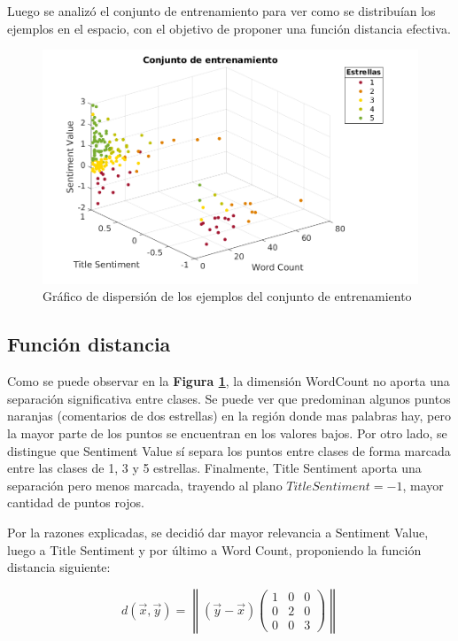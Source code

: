 \documentclass[a4paper]{article}
\newcommand{\reffig}[1]{\textbf{Figura \ref{#1}}}
\begin{document}
Luego se analizó el conjunto de entrenamiento para ver como se distribuían los ejemplos en el espacio, con el objetivo de proponer una función distancia efectiva.

\begin{figure}[h]
  \centering
    \includegraphics[scale=0.5]{img/knn-training-set-scatter.png}
  \caption{Gráfico de dispersión de los ejemplos del conjunto de entrenamiento}
  \label{fig:ej3-scatter-training}
\end{figure}


\subsection{Función distancia}
Como se puede observar en la \reffig{fig:ej3-scatter-training}, la dimensión WordCount no aporta una separación significativa entre clases. Se puede ver que predominan algunos puntos naranjas (comentarios de dos estrellas) en la región donde mas palabras hay, pero la mayor parte de los puntos se encuentran en los valores bajos. Por otro lado, se distingue que Sentiment Value sí separa los puntos entre clases de forma marcada entre las clases de 1, 3 y 5 estrellas. Finalmente, Title Sentiment aporta una separación pero menos marcada, trayendo al plano $TitleSentiment = -1$, mayor cantidad de puntos rojos.

Por la razones explicadas, se decidió dar mayor relevancia a Sentiment Value, luego a Title Sentiment y por último a Word Count, proponiendo la función distancia siguiente:

\begin{equation}
  d(\vec{x},\vec{y}) = \left \|(\vec{y}-\vec{x})\begin{pmatrix}
    1 & 0 & 0\\ 
    0 & 2 & 0\\ 
    0 & 0 & 3
    \end{pmatrix}\right \|
\end{equation}
\end{document}
